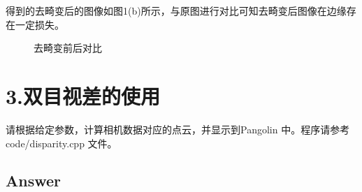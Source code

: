 \documentclass[
	12pt, %
]{fphw} %
\begin{document}
得到的去畸变后的图像如图1(b)所示，与原图进行对比可知去畸变后图像在边缘存在一定损失。
\begin{figure}[ht]
	\centering
	\hspace{0in}
	\caption{去畸变前后对比}
\end{figure}

\clearpage
\section*{3.双目视差的使用}

\begin{problem}
	请根据给定参数，计算相机数据对应的点云，并显示到Pangolin 中。程序请参考code/disparity.cpp 文件。
	
	\medskip
	
\end{problem}


\subsection*{Answer}
\end{document}
